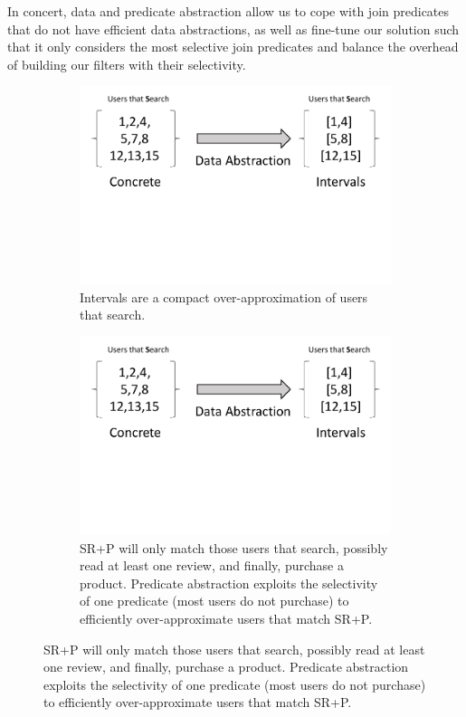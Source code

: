 In concert, data and predicate abstraction allow us to cope with join predicates
that do not have efficient data abstractions, as well as fine-tune our solution
such that it only considers the most selective join predicates and balance the
overhead of building our filters with their selectivity.
\begin{figure}
  \centering
  \begin{subfigure}{\columnwidth}
    \centering    
    \includegraphics[clip, page=1,width=\columnwidth]{graphs/motivation.pdf}
    \vspace{-3cm}
    \caption{Intervals are a compact over-approximation of users that search.}
    \label{fig:dabstraction}
  \end{subfigure}
  \begin{subfigure}{\columnwidth}
    \includegraphics[clip, page=2,width=\columnwidth]{graphs/motivation.pdf}
    \caption{SR+P will only match those users that search, possibly read at
      least one review, and finally, purchase a product.  Predicate abstraction
      exploits the selectivity of one predicate (most users do not purchase) to
      efficiently over-approximate users that match SR+P.}
    \label{fig:pabstraction}
  \end{subfigure}
\end{figure}
      
